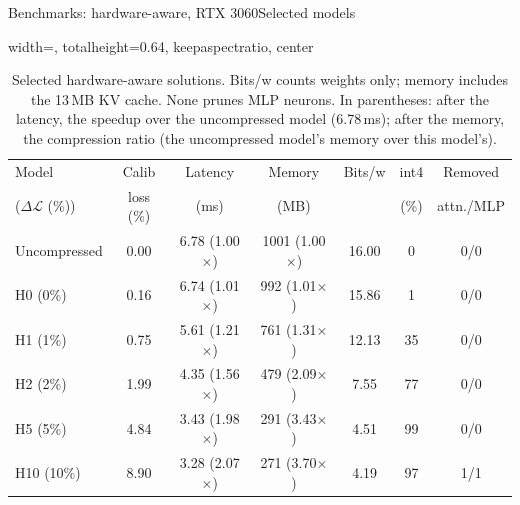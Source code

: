 \documentclass[aspectratio=169,10pt]{beamer}
\newcommand{\dloss}{\Delta\mathcal{L}}
\begin{document}
\begin{frame}{Benchmarks: hardware-aware, RTX 3060}{Selected models}
\begin{table}
\centering
\begin{adjustbox}{width=\linewidth, totalheight=0.64\textheight, keepaspectratio, center}
\centering
\footnotesize
\setlength{\tabcolsep}{3.5pt}
\begin{tabular}{lcccccc}
\toprule
Model & Calib & Latency & Memory & Bits/w & int4 & Removed \\
($\dloss$ (\%)) & loss (\%) & (ms) & (MB) & & (\%) & attn./MLP \\
\midrule
Uncompressed & 0.00 & 6.78 (1.00$\times$) & 1001 (1.00$\times$) & 16.00 & 0  & 0/0 \\
\addlinespace
H0  (0\%)  & 0.16 & 6.74 (1.01$\times$) & 992 (1.01$\times$) & 15.86 & 1  & 0/0 \\
H1  (1\%)  & 0.75 & 5.61 (1.21$\times$) & 761 (1.31$\times$) & 12.13 & 35 & 0/0 \\
H2  (2\%)  & 1.99 & 4.35 (1.56$\times$) & 479 (2.09$\times$) & 7.55  & 77 & 0/0 \\
H5  (5\%)  & 4.84 & 3.43 (1.98$\times$) & 291 (3.43$\times$) & 4.51  & 99 & 0/0 \\
H10 (10\%) & 8.90 & 3.28 (2.07$\times$) & 271 (3.70$\times$) & 4.19  & 97 & 1/1 \\
\bottomrule
\end{tabular}
\end{adjustbox}
\caption{Selected hardware-aware solutions. Bits/w counts weights only; memory includes the 13\,MB KV
cache. None prunes MLP neurons. In parentheses: after the latency, the speedup over the uncompressed model
(6.78\,ms); after the memory, the compression ratio (the uncompressed model's memory over this model's).}\label{tab:hwmodels}
\end{table}
\end{frame}
\end{document}
